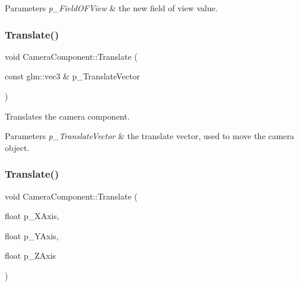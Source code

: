 \begin{DoxyParams}{Parameters}
{\em p\+\_\+\+Field\+O\+F\+View} & the new field of view value. \\
\hline
\end{DoxyParams}
\mbox{\label{class_camera_component_a4d35b8d9c30b1a0a2333ccd947697cb5}} 
\subsubsection{\texorpdfstring{Translate()}{Translate()}\hspace{0.1cm}{\footnotesize\ttfamily [1/2]}}
{\footnotesize\ttfamily void Camera\+Component\+::\+Translate (\begin{DoxyParamCaption}\item[{const glm\+::vec3 \&}]{p\+\_\+\+Translate\+Vector }\end{DoxyParamCaption})\hspace{0.3cm}{\ttfamily [inline]}}



Translates the camera component. 


\begin{DoxyParams}{Parameters}
{\em p\+\_\+\+Translate\+Vector} & the translate vector, used to move the camera object. \\
\hline
\end{DoxyParams}
\mbox{\label{class_camera_component_a27e2e9bdcd4d673967b9187cb3524e5b}} 
\subsubsection{\texorpdfstring{Translate()}{Translate()}\hspace{0.1cm}{\footnotesize\ttfamily [2/2]}}
{\footnotesize\ttfamily void Camera\+Component\+::\+Translate (\begin{DoxyParamCaption}\item[{float}]{p\+\_\+\+X\+Axis,  }\item[{float}]{p\+\_\+\+Y\+Axis,  }\item[{float}]{p\+\_\+\+Z\+Axis }\end{DoxyParamCaption})\hspace{0.3cm}{\ttfamily [inline]}}



